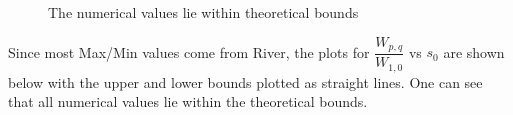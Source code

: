 ﻿\documentclass[12pt,a4paper]{article}
\begin{document}
\begin{figure}[H]
    \centering
     \caption{The numerical values lie within theoretical bounds}
\end{figure}
Since most Max/Min values come from River, the plots for $\dfrac{W_{p,q}}{W_{1,0}}$ vs $s_{0}$ are shown below with the upper and lower bounds plotted as straight lines. One can see that all numerical values lie within the theoretical bounds.
\end{document}
